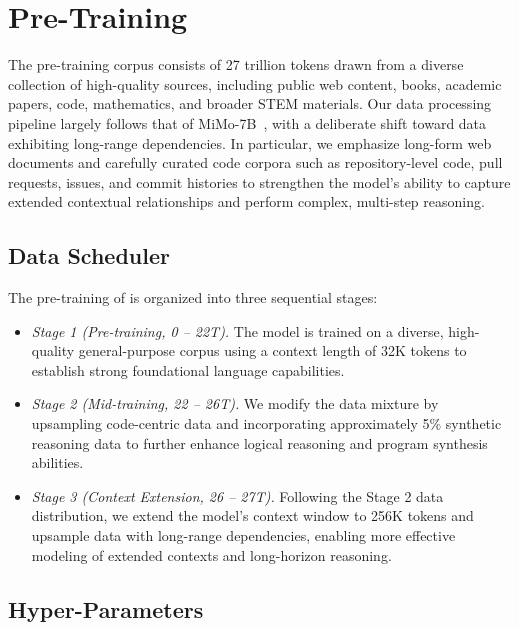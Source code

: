 \section{Pre-Training}


The \mimoflash{} pre-training corpus consists of 27 trillion tokens drawn from a diverse collection of high-quality sources, including public web content, books, academic papers, code, mathematics, and broader STEM materials. Our data processing pipeline largely follows that of MiMo-7B~\citep{xia2025mimo}, with a deliberate shift toward data exhibiting long-range dependencies.
In particular, we emphasize long-form web documents and carefully curated code corpora such as repository-level code, pull requests, issues, and commit histories to strengthen the model’s ability to capture extended contextual relationships and perform complex, multi-step reasoning.

\subsection{Data Scheduler} The pre-training of \mimoflash{} is organized into three sequential stages:
\begin{itemize}
  

\item \textit{Stage 1 (Pre-training, 0 -- 22T).} The model is trained on a diverse, high-quality general-purpose corpus using a context length of 32K tokens to establish strong foundational language capabilities.

\item \textit{Stage 2 (Mid-training, 22 -- 26T).} We modify the data mixture by upsampling code-centric data and incorporating approximately 5\% synthetic reasoning data to further enhance logical reasoning and program synthesis abilities.

\item \textit{Stage 3 (Context Extension, 26 -- 27T).} Following the Stage 2 data distribution, we extend the model’s context window to 256K tokens and upsample data with long-range dependencies, enabling more effective modeling of extended contexts and long-horizon reasoning.

\end{itemize}

\subsection{Hyper-Parameters}
